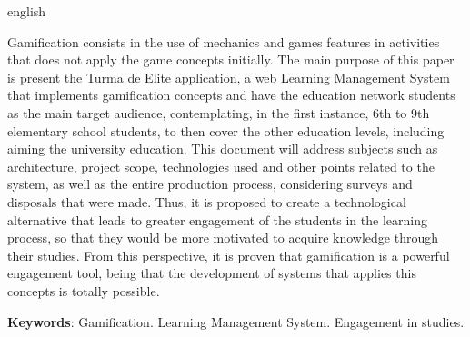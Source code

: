 \documentclass[
    12pt,               %
    openright,          %
    oneside,
    a4paper,            %
    english,            %
    brazil              %
    ]{ifsp-spo-inf-ctds} %
\begin{document}
\begin{resumo}[Abstract]
 \begin{otherlanguage*}{english}
 
    \vspace{\onelineskip}
 
     Gamification consists in the use of mechanics and games features in activities that does not apply the game concepts initially. The main purpose of this paper is present the Turma de Elite application, a web Learning Management System that implements gamification concepts and have the education network students as the main target audience, contemplating, in the first instance, 6th to 9th elementary school students, to then cover the other education levels, including aiming the university education.
     This document will address subjects such as architecture, project scope, technologies used and other points related to the system, as well as the entire production process, considering surveys and disposals that were made.
     Thus, it is proposed to create a technological alternative that leads to greater engagement of the students in the learning process, so that they would be more motivated to acquire knowledge through their studies. From this perspective, it is proven that gamification is a powerful engagement tool, being that the development of systems that applies this concepts is totally possible.
     
   \vspace{\onelineskip}
   \noindent 
   \textbf{Keywords}: Gamification. Learning Management System. Engagement in studies.
 \end{otherlanguage*}
\end{resumo}

\listoffigures*
\cleardoublepage

\listoftables*
\cleardoublepage

\listofquadros*
\cleardoublepage

\ifdef{\printnoidxglossary}{
    \printnoidxglossary[type=\acronymtype,title=Lista de abreviaturas e siglas,style=siglas]
    \cleardoublepage
}{}

\tableofcontents*
\end{document}
